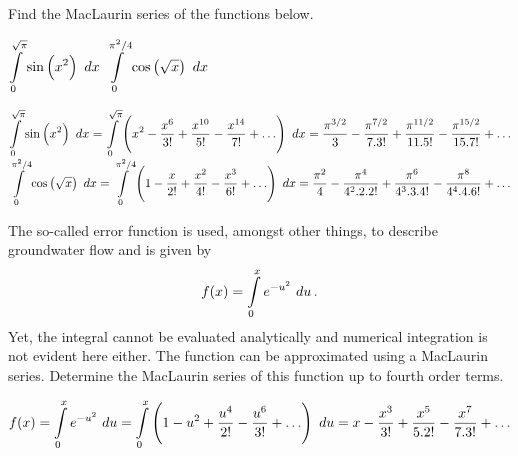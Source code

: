 \begin{Exercise}[difficulty = 3]  Find the MacLaurin series of the functions below. 
\begin{multicols}{2}
    \Question $\displaystyle \int\limits_0^{\sqrt{\pi}} \sin \left(x^2\right)\ dx$ 
    \Question $\displaystyle \int\limits_0^{\pi^2/4} \cos \left(\sqrt{x}\right)\ dx$ 
    \EndCurrentQuestion
\end{multicols}
\end{Exercise}

\begin{Answer}

    \Question $\displaystyle \int\limits_0^{\sqrt{\pi}} \sin \left(x^2\right)\ dx = \displaystyle \int\limits_0^{\sqrt{\pi}} \left( x^2 - \dfrac{x^6}{3!} + \dfrac{x^{10}}{5!} - \dfrac{x^{14}}{7!} + \ldots  \right)\ dx  =  \dfrac{\pi^{3/2}}{3} - \dfrac{\pi^{7/2}}{7.3!} +\dfrac{\pi^{11/2}}{11.5!} - \dfrac{\pi^{15/2}}{15.7!} + \ldots $ 
    \Question $\displaystyle \int\limits_0^{\pi^2/4} \cos \left(\sqrt{x}\right)\ dx = \displaystyle \int\limits_0^{\pi^2/4} \left(1 - \dfrac{x}{2!} + \dfrac{x^2}{4!} - \dfrac{x^3}{6!} + \ldots \right)\ dx =  \dfrac{\pi^{2}}{4} - \dfrac{\pi^{4}}{4^2.2.2!} +\dfrac{\pi^{6}}{4^3.3.4!} - \dfrac{\pi^{8}}{4^4.4.6!} + \ldots $ 
    
\end{Answer}




\begin{Exercise}[difficulty = 2]  The so-called error function is used, amongst other things, to describe groundwater flow and is given by
\[f(x)=\displaystyle \int\limits_0^x e^{-u^2}\ du\,. \]
Yet, the integral cannot be evaluated analytically and numerical integration is not evident here either. The function can be approximated using a MacLaurin series. Determine the MacLaurin series of this function up to fourth order terms. 
\end{Exercise}

\begin{Answer}
    $f(x)=\displaystyle \int\limits_0^x e^{-u^2}\ du = \displaystyle \int\limits_0^{x} \left(1 - u^2 + \dfrac{u^4}{2!} - \dfrac{u^6}{3!} + \ldots \right)\ du = x- \dfrac{x^3}{3!} + \dfrac{x^5}{5.2!} -\dfrac{x^7}{7.3!}  + \ldots $
\end{Answer}
